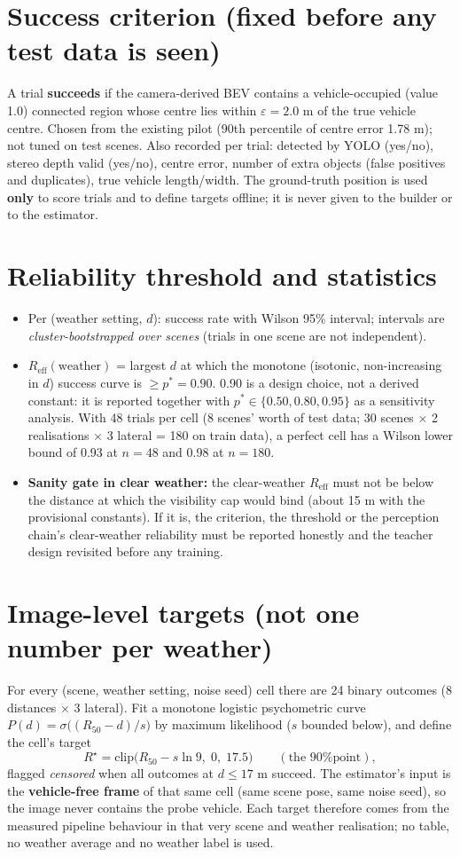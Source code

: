 \documentclass[11pt,a4paper]{article}
\begin{document}
\section{Success criterion (fixed before any test data is seen)}
A trial \textbf{succeeds} if the camera-derived BEV contains a vehicle-occupied (value 1.0) connected region whose centre lies within $\varepsilon=2.0$ m of the true vehicle centre. Chosen from the existing pilot (90th percentile of centre error 1.78 m); not tuned on test scenes. Also recorded per trial: detected by YOLO (yes/no), stereo depth valid (yes/no), centre error, number of extra objects (false positives and duplicates), true vehicle length/width. The ground-truth position is used \textbf{only} to score trials and to define targets offline; it is never given to the builder or to the estimator.

\section{Reliability threshold and statistics}
\begin{itemize}
\item Per (weather setting, $d$): success rate with Wilson 95\% interval; intervals are \emph{cluster-bootstrapped over scenes} (trials in one scene are not independent).
\item $R_{\mathrm{eff}}(\text{weather})$ = largest $d$ at which the monotone (isotonic, non-increasing in $d$) success curve is $\ge p^{*}=0.90$. 0.90 is a design choice, not a derived constant: it is reported together with $p^{*}\in\{0.50,0.80,0.95\}$ as a sensitivity analysis. With 48 trials per cell (8 scenes' worth of test data; 30 scenes $\times$ 2 realisations $\times$ 3 lateral = 180 on train data), a perfect cell has a Wilson lower bound of 0.93 at $n=48$ and 0.98 at $n=180$.
\item \textbf{Sanity gate in clear weather:} the clear-weather $R_{\mathrm{eff}}$ must not be below the distance at which the visibility cap would bind (about 15 m with the provisional constants). If it is, the criterion, the threshold or the perception chain's clear-weather reliability must be reported honestly and the teacher design revisited before any training.
\end{itemize}

\section{Image-level targets (not one number per weather)}
For every (scene, weather setting, noise seed) cell there are 24 binary outcomes (8 distances $\times$ 3 lateral). Fit a monotone logistic psychometric curve $P(d)=\sigma\big((R_{50}-d)/s\big)$ by maximum likelihood ($s$ bounded below), and define the cell's target
\[ R^{\star}=\mathrm{clip}\big(R_{50}-s\ln 9,\;0,\;17.5\big)\qquad(\text{the 90\% point}),\]
flagged \emph{censored} when all outcomes at $d\le17$ m succeed. The estimator's input is the \textbf{vehicle-free frame} of that same cell (same scene pose, same noise seed), so the image never contains the probe vehicle. Each target therefore comes from the measured pipeline behaviour in that very scene and weather realisation; no table, no weather average and no weather label is used.
\end{document}
